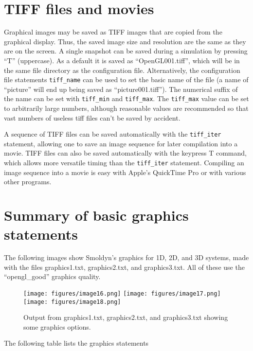 \documentclass {scrbook}
\newcommand {\ttt} {\texttt}
\begin{document}
\section{TIFF files and movies}

Graphical images may be saved as TIFF images that are copied from the graphical display. Thus, the saved image size and resolution are the same as they are on the screen. A single snapshot can be saved during a simulation by pressing ``T'' (uppercase). As a default it is saved as ``OpenGL001.tiff'', which will be in the same file directory as the configuration file. Alternatively, the configuration file statements \ttt{tiff\_name} can be used to set the basic name of the file (a name of ``picture'' will end up being saved as ``picture001.tiff''). The numerical suffix of the name can be set with \ttt{tiff\_min} and \ttt{tiff\_max}. The \ttt{tiff\_max} value can be set to arbitrarily large numbers, although reasonable values are recommended so that vast numbers of useless tiff files can't be saved by accident.

A sequence of TIFF files can be saved automatically with the \ttt{tiff\_iter} statement, allowing one to save an image sequence for later compilation into a movie. TIFF files can also be saved automatically with the keypress T command, which allows more versatile timing than the \ttt{tiff\_iter} statement. Compiling an image sequence into a movie is easy with Apple's QuickTime Pro or with various other programs.

\section{Summary of basic graphics statements}

The following images show Smoldyn's graphics for 1D, 2D, and 3D systems, made with the files graphics1.txt, graphics2.txt, and graphics3.txt. All of these use the ``opengl\_good'' graphics quality.

\begin{figure}[h]
\centering
\texttt{[image: figures/image16.png]}
\texttt{[image: figures/image17.png]}
\texttt{[image: figures/image18.png]}
\caption{Output from graphics1.txt, graphics2.txt, and graphics3.txt showing some graphics options.}
\label{fig:graphics1}
\end{figure}

The following table lists the graphics statements
\end{document}
